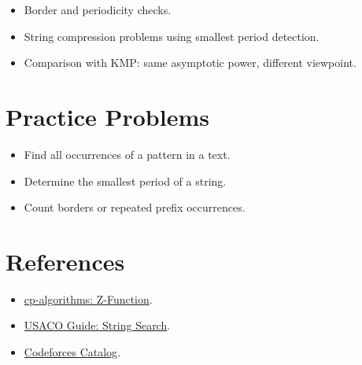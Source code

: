 \begin{itemize}
  \item Border and periodicity checks.
  \item String compression problems using smallest period detection.
  \item Comparison with KMP: same asymptotic power, different viewpoint.
\end{itemize}

\section*{Practice Problems}

\begin{itemize}
  \item Find all occurrences of a pattern in a text.
  \item Determine the smallest period of a string.
  \item Count borders or repeated prefix occurrences.
\end{itemize}

\section*{References}

\begin{itemize}
  \item \href{https://cp-algorithms.com/string/z-function.html}{cp-algorithms: Z-Function}.
  \item \href{https://usaco.guide/adv/string-search?lang=cpp}{USACO Guide: String Search}.
  \item \href{https://codeforces.com/catalog}{Codeforces Catalog}.
\end{itemize}
